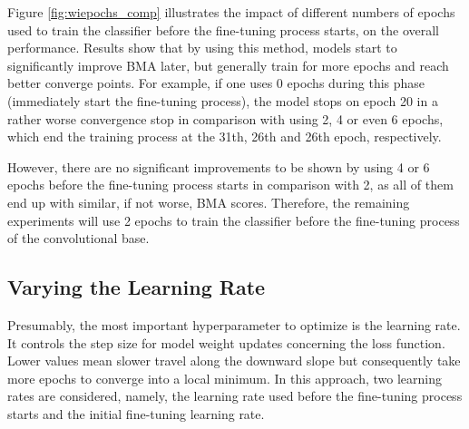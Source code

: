     Figure \ref{fig:wiepochs_comp} illustrates the impact of different numbers of epochs used to train the classifier before the fine-tuning process starts, on the overall performance. Results show that by using this method, models start to significantly improve \ac{BMA} later, but generally train for more epochs and reach better converge points. For example, if one uses 0 epochs during this phase (immediately start the fine-tuning process), the model stops on epoch 20 in a rather worse convergence stop in comparison with using 2, 4 or even 6 epochs, which end the training process at the 31th, 26th and 26th epoch, respectively. \par
    
    However, there are no significant improvements to be shown by using 4 or 6 epochs before the fine-tuning process starts in comparison with 2, as all of them end up with similar, if not worse, \ac{BMA} scores. Therefore, the remaining experiments will use 2 epochs to train the classifier before the fine-tuning process of the convolutional base. \par
    
    \subsection{Varying the Learning Rate}
    \label{section:lr_tune}
    Presumably, the most important hyperparameter to optimize is the learning rate. It controls the step size for model weight updates concerning the loss function. Lower values mean slower travel along the downward slope but consequently take more epochs to converge into a local minimum. In this approach, two learning rates are considered, namely, the learning rate used before the fine-tuning process starts and the initial fine-tuning learning rate. \par 
    
